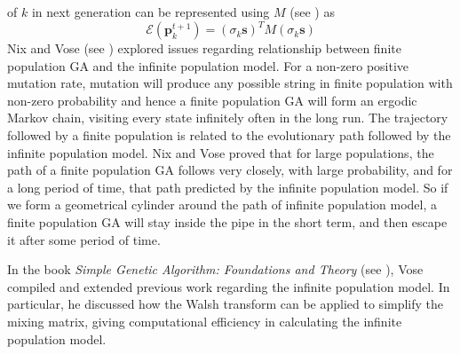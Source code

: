of $k$ in next generation can be represented using $M$ (see \cite{VoseLiepins1991}) as
\[
\mathcal{E}(\bm{p}_k^{t+1}) = (\sigma_k \bm{s})^T M (\sigma_k \bm{s})
\]
Nix and Vose (see \cite{Nix1992}) explored issues regarding relationship between finite population GA and the infinite population model. 
For a non-zero positive mutation rate, mutation 
will produce any possible string in finite population with non-zero probability and 
hence a finite population GA will form an ergodic Markov chain, visiting every state infinitely often in the long run.
The trajectory followed by a finite population is related to 
the evolutionary path followed by the infinite population model. 
Nix and Vose proved that for large populations, the path of a finite population GA follows very closely, 
with large probability, and for a long period of time, that path predicted by 
the infinite population model. So if we form 
a geometrical cylinder 
around the path of infinite population model, a finite population GA will stay inside the pipe in the short term, and 
then escape it after some period of time. 


In the book \textit{Simple Genetic Algorithm: Foundations and Theory} (see \cite{Vose1999}), Vose compiled and 
extended previous work regarding the infinite population model. In particular, he discussed how 
the Walsh transform can be applied to simplify the mixing matrix, giving 
computational efficiency in calculating the infinite population model.

